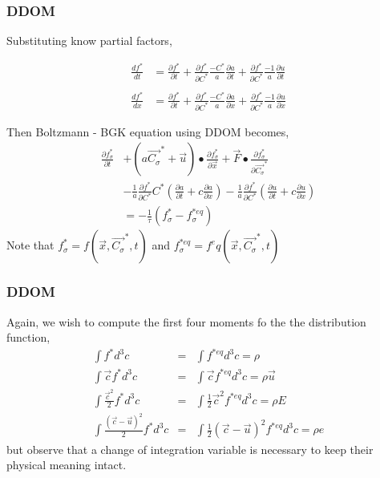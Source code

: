 \begin{frame}
	\frametitle{DDOM}
	Substituting know partial factors,
			
	\begin{align*}
		\frac{df^*}{dt} &= \frac{\partial{f^*}}{\partial{t}} + 
				\frac{\partial{f^*}}{\partial{C^*}} \frac{-C^*}{a} \frac{\partial{a}}{\partial{t}} + 
				\frac{\partial{f^*}}{\partial{C^*}} \frac{ -1 }{a} \frac{\partial{u}}{\partial{t}}
		\\		
		\\ \frac{df^*}{dx} &= \frac{\partial{f^*}}{\partial{t}} + 
				\frac{\partial{f^*}}{\partial{C^*}} \frac{-C^*}{a} \frac{\partial{a}}{\partial{x}} + 
				\frac{\partial{f^*}}{\partial{C^*}} \frac{ -1 }{a} \frac{\partial{u}}{\partial{x}}
	\end{align*}
\end{frame}

\begin{frame}
Then Boltzmann - BGK equation using DDOM becomes,
	\begin{equation}
		\begin{split}
			\frac{\partial{f^*_\sigma}}{\partial{t}} &+ (a\vec{C_\sigma}^{*}+\vec{u})\bullet\frac{\partial{f^*_\sigma}}{\partial{\vec{x}}} 
			+\vec{F}\bullet\frac{\partial{f^*_\sigma}}{\partial{\vec{C_\sigma}^{*}}}
			\\ &-\frac{1}{a}\frac{\partial f^*}{\partial C^*}C^*\left(\frac{\partial a}{\partial t} +c \frac{\partial a}{\partial x} \right )
			-\frac{1}{a}\frac{\partial f^*}{\partial C^*}\left(\frac{\partial u}{\partial t} +c \frac{\partial u}{\partial x} \right ) 
			\\ &= -\frac{1}{\tau}(f^*_\sigma-f^{*eq}_\sigma)
		\end{split}
	\end{equation}
	Note that $f^*_\sigma = f(\vec{x},\vec{C_\sigma}^{*},t)$ and $f^{*eq}_\sigma=f^eq(\vec{x},\vec{C_\sigma}^{*},t)$
\end{frame}

\begin{frame}
	\frametitle{DDOM}
	Again, we wish to compute the first four moments fo the the distribution function,
	\begin{eqnarray}
	\int f^* d^3 c  &=& \int f^{*eq}d^3c = \rho \\
	\int \vec{c} f^* d^3 c  &=& \int \vec{c} f^{*eq}d^3c = \rho \vec{u} \nonumber \\
	\int \frac{\vec{c}^2}{2} f^* d^3 c  &=& \int \frac{1}{2}\vec{c}^2 f^{*eq}d^3c = \rho E \nonumber \\
	\int \frac{(\vec{c}-\vec{u})^2}{2} f^* d^3 c  &=& \int \frac{1}{2}(\vec{c}-\vec{u})^2 f^{*eq}d^3c = \rho e \nonumber
	\end{eqnarray}
	but observe that a change of integration variable is necessary to keep their physical meaning intact.
\end{frame}

